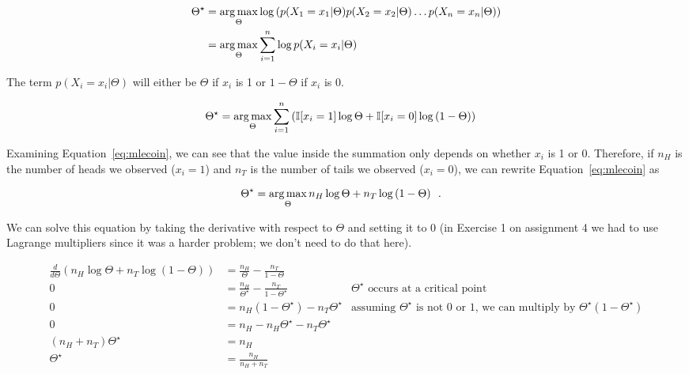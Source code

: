 \documentclass{tufte-handout}
\begin{document}
\begin{align}
\Theta^\star &= \operatorname*{arg\,max}_{\Theta} \log \left ( p(X_1 = x_1 | \Theta) p(X_2 = x_2 | \Theta) \ldots p(X_n = x_n | \Theta) \right) \nonumber \\
&= \operatorname*{arg\,max}_{\Theta} \sum_{i=1}^n \log  p(X_i = x_i | \Theta)
\end{align}

The term $p(X_i = x_i | \Theta)$ will either be $\Theta$ if $x_i$ is 1 or $1-\Theta$ if $x_i$ is 0.

\begin{align}
\Theta^\star &= \operatorname*{arg\,max}_{\Theta} \sum_{i=1}^n \left ( \mathbb{I} [ x_i =1] \log \Theta  + \mathbb{I}[x_i = 0]  \log\left (1-  \Theta \right) \right) \label{eq:mlecoin}
\end{align}

Examining Equation~\ref{eq:mlecoin}, we can see that the value inside the summation only depends on whether $x_i$ is 1 or 0.  Therefore, if $n_{H}$ is the number of heads we observed ($x_i = 1$) and $n_{T}$ is the number of tails we observed ($x_i = 0$), we can rewrite Equation~\ref{eq:mlecoin} as


\begin{align}
\Theta^\star &= \operatorname*{arg\,max}_{\Theta} n_H \log \Theta  + n_T  \log\left (1-  \Theta \right) \label{eq:mlecoincount} \enspace .
\end{align}

We can solve this equation by taking the derivative with respect to $\Theta$ and setting it to 0 (in Exercise 1 on assignment 4 we had to use Lagrange multipliers since it was a harder problem; we don't need to do that here).

\begin{align}
\frac{d}{d\Theta} \left ( n_H \log \Theta  + n_T  \log\left (1-  \Theta \right) \right) &=  \frac{n_H}{\Theta} - \frac{n_T}{1-\Theta} \nonumber \\
0 &= \frac{n_H}{\Theta^\star} - \frac{n_T}{1-\Theta^\star} \nonumber & \mbox{$\Theta^\star$ occurs at a critical point}\\
0 &=  n_H(1-\Theta^\star) - n_T \Theta^\star &\mbox{assuming $\Theta^\star$ is not 0 or 1, we can multiply by $\Theta^\star(1-\Theta^\star)$} \nonumber \\
0&= n_H - n_H \Theta^\star -  n_T \Theta^\star \nonumber \\
(n_H + n_T) \Theta^\star &= n_H \nonumber \\
\Theta^\star &= \frac{n_H}{n_H + n_T} \nonumber \\
\end{align}
\end{document}

